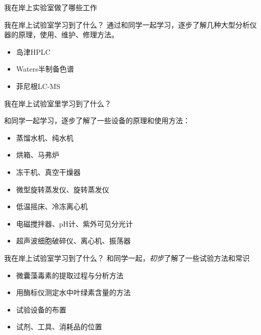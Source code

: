 \documentclass[CJKutf8]{beamer}
\newenvironment{SC}{%
  \CJKfamily{gbsn}%
  \CJKtilde
  \CJKnospace}{}
\begin{document}
\begin{CJK}{UTF8}{}
\begin{SC}
\begin{frame}{我在岸上实验室做了哪些工作}
\end{frame}

\begin{frame}{我在岸上试验室学习到了什么？}
通过和同学一起学习，逐步了解几种大型分析仪器的原理，使用、维护、修理方法。

    \begin{itemize}
    \item
      岛津HPLC
      \pause
    \item    
      Waters半制备色谱
      \pause
    \item
      菲尼根LC-MS
    
    \end{itemize}

\end{frame}


\begin{frame}{我在岸上试验室里学习到了什么？}

和同学一起学习，逐步了解了一些设备的原理和使用方法：
    \begin{itemize}
    \item 蒸馏水机、纯水机
    \item 烘箱、马弗炉
    \item 冻干机、真空干燥器
    \item 微型旋转蒸发仪、旋转蒸发仪
    \item 低温摇床、冷冻离心机
    \item 电磁搅拌器、pH计、紫外可见分光计
    \item 超声波细胞破碎仪、离心机、振荡器
    \end{itemize}

\end{frame}

\begin{frame}{我在岸上试验室学习到了什么？}
和同学一起，\emph{初步}了解了一些试验方法和常识
  \begin{itemize}
  \item 微囊藻毒素的提取过程与分析方法
  \item 用酶标仪测定水中叶绿素含量的方法
  \item 试验设备的布置
  \item 试剂、工具、消耗品的位置
  \end{itemize}
\end{frame}


\end{SC}
\end{CJK}
\end{document}

